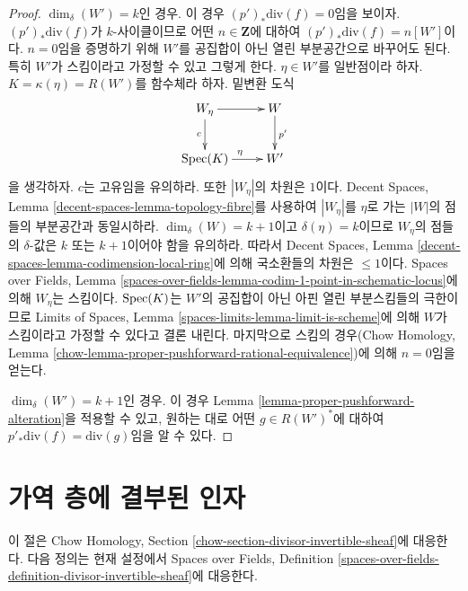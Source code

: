 \begin{proof}
\medskip\noindent
$\dim_\delta(W') = k$인 경우. 이 경우
$(p')_*\text{div}(f) = 0$임을 보이자.
$(p')_*\text{div}(f)$가 $k$-사이클이므로 어떤
$n \in \mathbf{Z}$에 대하여 $(p')_*\text{div}(f) = n[W']$이다.
$n = 0$임을 증명하기 위해 $W'$를 공집합이 아닌 열린 부분공간으로
바꾸어도 된다. 특히 $W'$가 스킴이라고 가정할 수 있고 그렇게 한다.
$\eta \in W'$를 일반점이라 하자.
$K = \kappa(\eta) = R(W')$를 함수체라 하자. 밑변환 도식
$$
\xymatrix{
W_\eta \ar[r] \ar[d]_c & W \ar[d]^{p'} \\
\Spec(K) \ar[r]^\eta & W'
}
$$
을 생각하자. $c$는 고유임을 유의하라. 또한 $|W_\eta|$의 차원은
$1$이다. Decent Spaces, Lemma
\ref{decent-spaces-lemma-topology-fibre}를 사용하여 $|W_\eta|$를
$\eta$로 가는 $|W|$의 점들의 부분공간과 동일시하라.
$\dim_\delta(W) = k + 1$이고 $\delta(\eta) = k$이므로
$W_\eta$의 점들의 $\delta$-값은 $k$ 또는 $k + 1$이어야 함을
유의하라. 따라서 Decent Spaces, Lemma
\ref{decent-spaces-lemma-codimension-local-ring}에 의해 국소환들의
차원은 $\leq 1$이다. Spaces over Fields, Lemma
\ref{spaces-over-fields-lemma-codim-1-point-in-schematic-locus}에 의해
$W_\eta$는 스킴이다. $\mathop{\mathrm{Spec}}(K)$는 $W'$의 공집합이 아닌 아핀 열린
부분스킴들의 극한이므로 Limits of Spaces, Lemma
\ref{spaces-limits-lemma-limit-is-scheme}에 의해 $W$가 스킴이라고
가정할 수 있다고 결론 내린다. 마지막으로 스킴의 경우(Chow Homology,
Lemma \ref{chow-lemma-proper-pushforward-rational-equivalence})에 의해
$n = 0$임을 얻는다.

\medskip\noindent
$\dim_\delta(W') = k + 1$인 경우. 이 경우 Lemma
\ref{lemma-proper-pushforward-alteration}을 적용할 수 있고,
원하는 대로 어떤 $g \in R(W')^*$에 대하여
$p'_*\text{div}(f) = \text{div}(g)$임을 알 수 있다.
\end{proof}

\section{가역 층에 결부된 인자}
\label{section-divisor-invertible-sheaf}

\noindent
이 절은 Chow Homology, Section
\ref{chow-section-divisor-invertible-sheaf}에 대응한다.
다음 정의는 현재 설정에서 Spaces over Fields, Definition
\ref{spaces-over-fields-definition-divisor-invertible-sheaf}에 대응한다.

